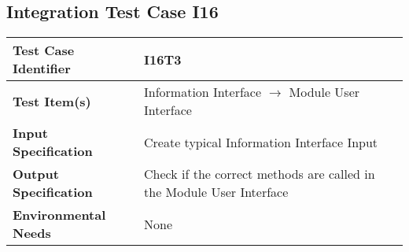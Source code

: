 \subsection{Integration Test Case I16}
\begin{tabular}{l p{9cm}}
	\hline
	\textbf{Test	Case Identifier} & I16T3 \\ \hline
	\textbf{Test	Item(s)} & Information Interface $\rightarrow$ Module User Interface \\ \hline
	\textbf{Input Specification} & Create typical Information Interface Input\\ \hline
	\textbf{Output Specification} & Check if the correct methods are called in the Module User Interface \\ \hline
	\textbf{Environmental Needs} & None \\ \hline
\end{tabular}